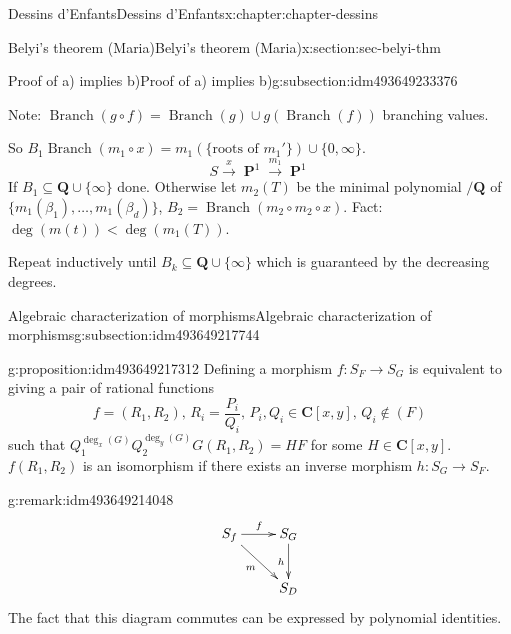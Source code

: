 \documentclass[oneside,10pt,]{book}
\numberwithin{equation}{section}
\newcommand{\lb}{[}
\newcommand{\rb}{]}
\newcommand{\QQ}{\mathbf{Q}}
\newcommand{\CC}{\mathbf{C}}
\DeclareMathOperator{\PP}{\mathbf{P}}
\newcommand{\lt}{<}
\begin{document}
\begin{chapterptx}{Dessins d'Enfants}{}{Dessins d'Enfants}{}{}{x:chapter:chapter-dessins}
\begin{sectionptx}{Belyi's theorem (Maria)}{}{Belyi's theorem (Maria)}{}{}{x:section:sec-belyi-thm}
\begin{subsectionptx}{Proof of a) implies b)}{}{Proof of a) implies b)}{}{}{g:subsection:idm493649233376}
\par
Note: \(\operatorname{Branch}(g\circ f) = \operatorname{Branch}(g) \cup g(\operatorname{Branch}(f))\) branching values.%
\par
So \(B_1 \operatorname{Branch}(m_1 \circ x) = m_1(\{\text{roots of }m_1'\}) \cup\{0,\infty\}\).%
\begin{equation*}
S\xrightarrow x \PP^1 \xrightarrow{m_1} \PP^1
\end{equation*}
If \(B_1 \subseteq \QQ \cup \{\infty\}\) done. Otherwise let \(m_2(T) \) be the minimal polynomial \(/\QQ\) of \(\{m_1(\beta_1) ,\ldots, m_1(\beta_d) \}\), \(B_2 = \operatorname{Branch}(m_2\circ m_2 \circ x)\). Fact: \(\deg(m(t)) \lt \deg(m_1(T))\).%
\par
Repeat inductively until \(B_k \subseteq \QQ \cup \{\infty\}\) which is guaranteed by the decreasing degrees.%
\end{subsectionptx}
%
%
\typeout{************************************************}
\typeout{************************************************}
%
\begin{subsectionptx}{Algebraic characterization of morphisms}{}{Algebraic characterization of morphisms}{}{}{g:subsection:idm493649217744}
\begin{proposition}{}{}{g:proposition:idm493649217312}%
Defining a morphism \(f \colon S_F\to S_G\) is equivalent to giving a pair of rational functions%
\begin{equation*}
f=  (R_1, R_2),\,R_i= \frac{P_i}{Q_i},\,    P_i,Q_i\in \CC[x,y],\,Q_i\not\in (F)
\end{equation*}
such that \(Q_1^{\deg_x(G)}Q_2^{\deg_y(G)} G(R_1, R_2) = HF\) for some \(H \in \CC\lb x, y\rb\). \(f(R_1, R_2)\) is an isomorphism if there exists an inverse morphism \(h\colon S_G\to S_F\).%
\end{proposition}
\begin{remark}{}{g:remark:idm493649214048}%
%
\begin{equation*}
\xymatrix{
S_f \ar[r]^f \ar[dr]_m & S_G \ar[d]_h \\
& S_D
}
\end{equation*}
The fact that this diagram commutes can be expressed by polynomial identities.%
\end{remark}
\end{subsectionptx}
%
%
\typeout{************************************************}
\typeout{************************************************}

\end{sectionptx}
\end{chapterptx}
\end{document}
